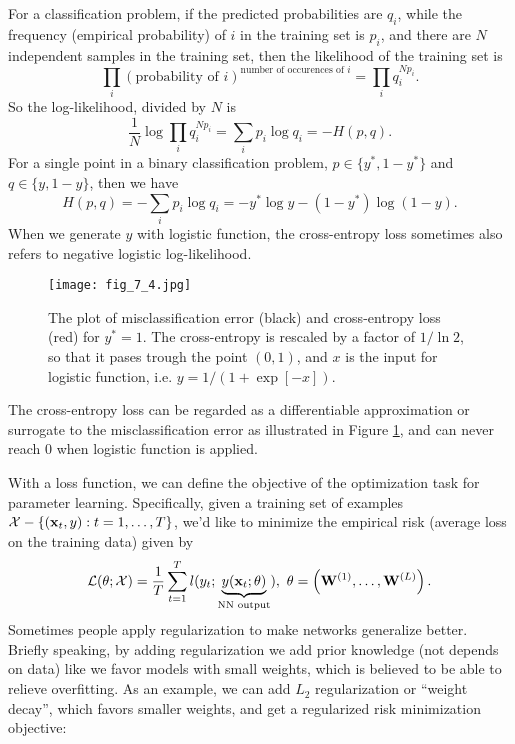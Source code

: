 \documentclass[../main.tex]{subfiles}
\begin{document}
For a classification problem, if the predicted probabilities are $q_i$, while the frequency (empirical probability) of $i$ in the training set is $p_i$, and there are $N$ independent samples in the training set, then the likelihood of the training set is
\begin{equation*}
\prod_{i}(\text{probability of }i)^{\text{number of occurences of }i}=\prod_{i}q_i^{Np_i}.
\end{equation*}
So the log-likelihood, divided by $N$ is
\begin{equation*}
\frac{1}{N}\log \prod_{i}q_i^{Np_i}=\sum_i p_i\log q_i=-H(p,q).
\end{equation*}
For a single point in a binary classification problem, $p\in \{y^*,1-y^*\}$ and $q\in \{y,1-y\}$, then we have
\begin{equation*}
H(p,q) = -\sum_i p_i\log q_i=-y^*\log y-(1-y^*)\log(1-y).
\end{equation*}
When we generate $y$ with logistic function, the cross-entropy loss sometimes also refers to negative logistic log-likelihood. 
\begin{figure}[h] 
	\centering 
	\texttt{[image: fig\_7\_4.jpg]} 
	\caption{The plot of misclassification error (black) and cross-entropy loss (red) for $y^*=1$. The cross-entropy is rescaled by a factor of $1/\ln 2$, so that it pases trough the point $(0,1)$, and $x$ is the input for logistic function, i.e. $y=1/(1+\exp[-x])$.}\label{fig_7_4}
\end{figure}
\par The cross-entropy loss can be regarded as a differentiable approximation or surrogate to the misclassification error as illustrated in Figure \ref{fig_7_4}, and can never reach 0 when logistic function is applied.
\par With a loss function, we can define the objective of the optimization task for parameter learning. Specifically, given a training set of examples $\mathcal{X}-\{({\bf x}_t,y):t=1,\dots,T\}$, we'd like to minimize the empirical risk (average loss on the training data) given by
\begin{equation*}
\mathcal{L}(\theta;\mathcal{X})=\frac{1}{T}\sum_{t=1}^{T}l(y_t;\underbrace{y({\bf x}_t;\theta)}_{\text{NN output}}),\ \theta=\left({\bf W}^{(1)},\dots,{\bf W}^{(L)}\right).
\end{equation*}
Sometimes people apply regularization to make networks generalize better. Briefly speaking, by adding regularization we add prior knowledge (not depends on data) like we favor models with small weights, which is believed to be able to relieve overfitting. As an example, we can add $L_2$ regularization or ``weight decay'', which favors smaller weights, and get a regularized risk minimization objective:
\end{document}

